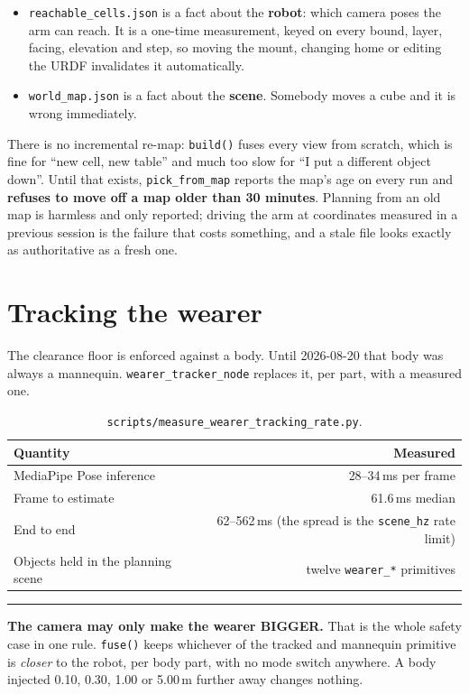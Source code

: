 \documentclass[11pt,a4paper,oneside]{report}
\newcommand{\code}[1]{\texttt{\small #1}}
\newcommand{\file}[1]{\texttt{\small #1}}
\newcommand{\keyfact}[1]{%
  \par\vspace{7pt}\noindent
  \hspace*{0pt}\textcolor{srlblue}{\rule{2.5pt}{\dimexpr\baselineskip\relax}}%
  \hspace{9pt}%
  \begin{minipage}[t]{\dimexpr\textwidth-14pt\relax}
  \small #1
  \end{minipage}\par\vspace{7pt}}
\begin{document}
\begin{itemize}
\item \file{reachable\_cells.json} is a fact about the \textbf{robot}: which
      camera poses the arm can reach. It is a one-time measurement, keyed on
      every bound, layer, facing, elevation and step, so moving the mount,
      changing home or editing the URDF invalidates it automatically.
\item \file{world\_map.json} is a fact about the \textbf{scene}. Somebody moves
      a cube and it is wrong immediately.
\end{itemize}

There is no incremental re-map: \code{build()} fuses every view from scratch,
which is fine for ``new cell, new table'' and much too slow for ``I put a
different object down''. Until that exists, \code{pick\_from\_map} reports the
map's age on every run and \textbf{refuses to move off a map older than 30
minutes}. Planning from an old map is harmless and only reported; driving the
arm at coordinates measured in a previous session is the failure that costs
something, and a stale file looks exactly as authoritative as a fresh one.

\section{Tracking the wearer}

The clearance floor is enforced against a body. Until 2026-08-20 that body was
always a mannequin. \code{wearer\_tracker\_node} replaces it, per part, with a
measured one.

\begin{table}[H]
\centering
\small
\begin{tabular}{@{}lr@{}}
\toprule
\textbf{Quantity} & \textbf{Measured} \\
\midrule
MediaPipe Pose inference & 28--34\,ms per frame \\
Frame to estimate & 61.6\,ms median \\
End to end & 62--562\,ms (the spread is the \code{scene\_hz} rate limit) \\
Objects held in the planning scene & twelve \code{wearer\_*} primitives \\
\bottomrule
\end{tabular}
\caption{\file{scripts/measure\_wearer\_tracking\_rate.py}.}
\end{table}

\keyfact{\textbf{The camera may only make the wearer BIGGER.} That is the whole
safety case in one rule. \code{fuse()} keeps whichever of the tracked and
mannequin primitive is \emph{closer} to the robot, per body part, with no mode
switch anywhere. A body injected 0.10, 0.30, 1.00 or 5.00\,m further away
changes nothing.}
\end{document}
